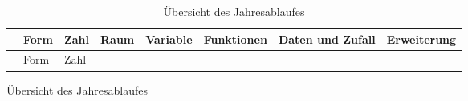 \documentclass[
  10pt,
  a4paper,
  DIV=11,
  oneside]{scrartcl}
\begin{document}
\begin{figure}

\begin{longtable}[]{@{}
  >{\raggedright\arraybackslash}p{}
  >{\raggedright\arraybackslash}p{}
  >{\raggedright\arraybackslash}p{}
  >{\raggedright\arraybackslash}p{}
  >{\raggedright\arraybackslash}p{}
  >{\raggedright\arraybackslash}p{}
  >{\raggedright\arraybackslash}p{}
  >{\raggedright\arraybackslash}p{}@{}}
\caption{Übersicht des Jahresablaufes}\tabularnewline
\toprule\noalign{}
\begin{minipage}[b]{\linewidth}\raggedright
\end{minipage} & \begin{minipage}[b]{\linewidth}\raggedright
Form
\end{minipage} & \begin{minipage}[b]{\linewidth}\raggedright
Zahl
\end{minipage} & \begin{minipage}[b]{\linewidth}\raggedright
Raum
\end{minipage} & \begin{minipage}[b]{\linewidth}\raggedright
Variable
\end{minipage} & \begin{minipage}[b]{\linewidth}\raggedright
Funktionen
\end{minipage} & \begin{minipage}[b]{\linewidth}\raggedright
Daten und Zufall
\end{minipage} & \begin{minipage}[b]{\linewidth}\raggedright
Erweiterung
\end{minipage} \\
\midrule\noalign{}
\endfirsthead
\toprule\noalign{}
\begin{minipage}[b]{\linewidth}\raggedright
\end{minipage} & \begin{minipage}[b]{\linewidth}\raggedright
Form
\end{minipage} & \begin{minipage}[b]{\linewidth}\raggedright
Zahl
\end{minipage} & \begin{minipage}[b]{\linewidth}\raggedright

\end{minipage}
\end{longtable}
\end{figure}
\end{document}
